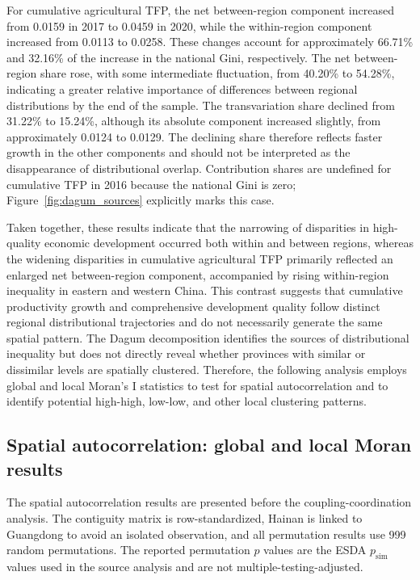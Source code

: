 \documentclass[sustainability,article,submit,moreauthors]{Definitions/mdpi}
\numberwithin{equation}{section}
\begin{document}
For cumulative agricultural TFP, the net between-region component increased
from 0.0159 in 2017 to 0.0459 in 2020, while the within-region component increased
from 0.0113 to 0.0258. These changes account for approximately 66.71\% and
32.16\% of the increase in the national Gini, respectively. The net
between-region share rose, with some intermediate fluctuation, from 40.20\% to
54.28\%, indicating a greater relative importance of differences between
regional distributions by the end of the sample. The transvariation share
declined from 31.22\% to 15.24\%, although its absolute component increased
slightly, from approximately 0.0124 to 0.0129. The declining share therefore
reflects faster growth in the other components and should not be interpreted
as the disappearance of distributional overlap. Contribution shares are
undefined for cumulative TFP in 2016 because the national Gini is zero;
Figure~\ref{fig:dagum_sources} explicitly marks this case.

Taken together, these results indicate that the narrowing of disparities in high-quality economic development occurred both within and between regions, whereas the widening disparities in cumulative agricultural TFP primarily reflected an enlarged net between-region component, accompanied by rising within-region inequality in eastern and western China. This contrast suggests that cumulative productivity growth and comprehensive development quality follow distinct regional distributional trajectories and do not necessarily generate the same spatial pattern. The Dagum decomposition identifies the sources of distributional inequality but does not directly reveal whether provinces with similar or dissimilar levels are spatially clustered. Therefore, the following analysis employs global and local Moran’s I statistics to test for spatial autocorrelation and to identify potential high-high, low-low, and other local clustering patterns.

\FloatBarrier
\subsection{Spatial autocorrelation: global and local Moran results}

The spatial autocorrelation results are presented before the coupling-coordination analysis. The contiguity matrix is row-standardized, Hainan is linked to Guangdong to avoid an isolated observation, and all permutation results use 999 random permutations. The reported permutation $p$ values are the ESDA $p_{\mathrm{sim}}$ values used in the source analysis and are not multiple-testing-adjusted.
\end{document}

